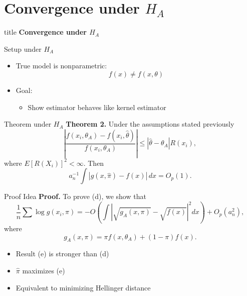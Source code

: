 \section{Convergence under $H_A$}
\begin{frame}{\hspace{3cm}}
\centering

\vspace{1.5cm}

\begin{beamercolorbox}[sep=20pt,center,rounded=true,shadow=true]{title}
    {\fontsize{20}{24}\selectfont \textbf{Convergence under $H_A$}}
\end{beamercolorbox}

\vspace{0.8cm}


\vfill

\end{frame}

\begin{frame}{Setup under $H_A$}
\begin{itemize}
    \item True model is nonparametric:
    \[
    f(x) \neq f(x,\theta)
    \]

    \item Goal:
    \begin{itemize}
        \item Show estimator behaves like kernel estimator
    \end{itemize}
\end{itemize}
\end{frame}


\begin{frame}{Theorem under $H_A$}
\small
\textbf{Theorem 2.} Under the assumptions stated previously
\[
\left|
\frac{f(x_i,\theta_A) - f(x_i,\hat{\theta})}{f(x_i,\theta_A)}
\right|
\leq
|\hat{\theta} - \theta_A| R(x_i),
\]
where $E[R(X_i)]^2 < \infty$. Then
\[
a_n^{-1} \int |g(x,\hat{\pi}) - f(x)| \, dx = O_p(1).
\tag{d}
\]
\end{frame}


\begin{frame}{Proof Idea}
\small
\textbf{Proof.} To prove (d), we show that
\[
\frac{1}{n} \sum \log g(x_i,\pi)
=
- O\left(
\int \left|\sqrt{g_A(x,\pi)} - \sqrt{f(x)}\right|^2 dx
\right)
+ O_p(a_n^2),
\tag{e}
\]
where
\[
g_A(x,\pi) = \pi f(x,\theta_A) + (1-\pi) f(x).
\]

\vspace{0.3cm}

\begin{itemize}
    \item Result (e) is stronger than (d)
    \item $\hat{\pi}$ maximizes (e)
    \item Equivalent to minimizing Hellinger distance
\end{itemize}
\end{frame}

